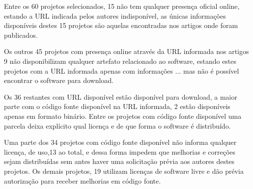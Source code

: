 Entre os 60 projetos selecionados, 15 não tem qualquer presença oficial online,
estando a URL indicada pelos autores indisponível, as únicas informações
disponíveis destes 15 projetos são aquelas encontradas nos artigos onde foram
publicados.

Os outros 45 projetos com presença online através da URL informada nos artigos
9 não disponibilizam qualquer artefato relacionado ao software, estando estes
projetos com a URL informada apenas com informações ... mas não é possível
encontrar o software para download.

Os 36 restantes com URL disponível estão disponível para download, a maior
parte com o código fonte disponível na URL informada, 2 estão disponíveis
apenas em formato binário. Entre os projetos com código fonte disponível
uma parcela deixa explícito qual licença e de que forma o software é
distribuído.

Uma parte dos 34 projetos com código fonte disponível não informa qualquer
licença, de uso,13 ao total, e dessa forma impedem que melhorias e correções
sejam distribuídas sem antes haver uma solicitação prévia aos autores destes
projetos. Os demais projetos, 19 utilizam licenças de software livre e dão
prévia autorização para receber melhorias em código fonte.






